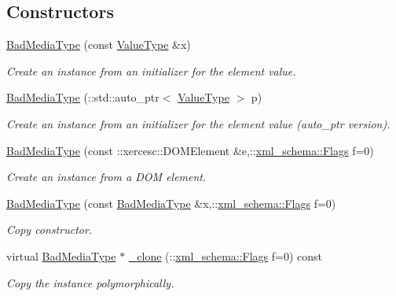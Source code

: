 \subsection*{Constructors}
\begin{DoxyCompactItemize}
\item 
\hyperlink{classopenstack_1_1xml_1_1BadMediaType_a827e80d7b575988d391fa8d8491f4aff}{BadMediaType} (const \hyperlink{classopenstack_1_1xml_1_1BadMediaTypeAPIFault}{ValueType} \&x)
\begin{DoxyCompactList}\small\item\em Create an instance from an initializer for the element value. \item\end{DoxyCompactList}\item 
\hyperlink{classopenstack_1_1xml_1_1BadMediaType_a79079b136a0ed4b1c25216ec65c24fe0}{BadMediaType} (::std::auto\_\-ptr$<$ \hyperlink{classopenstack_1_1xml_1_1BadMediaTypeAPIFault}{ValueType} $>$ p)
\begin{DoxyCompactList}\small\item\em Create an instance from an initializer for the element value (auto\_\-ptr version). \item\end{DoxyCompactList}\item 
\hyperlink{classopenstack_1_1xml_1_1BadMediaType_ab69de69eac22da49905e13bb951e3d48}{BadMediaType} (const ::xercesc::DOMElement \&e,::\hyperlink{namespacexml__schema_affb4c227cbd9aa7453dd1dc5a1401943}{xml\_\-schema::Flags} f=0)
\begin{DoxyCompactList}\small\item\em Create an instance from a DOM element. \item\end{DoxyCompactList}\item 
\hyperlink{classopenstack_1_1xml_1_1BadMediaType_a23f4bbd0e7b8fbdb262d3064dfed337d}{BadMediaType} (const \hyperlink{classopenstack_1_1xml_1_1BadMediaType}{BadMediaType} \&x,::\hyperlink{namespacexml__schema_affb4c227cbd9aa7453dd1dc5a1401943}{xml\_\-schema::Flags} f=0)
\begin{DoxyCompactList}\small\item\em Copy constructor. \item\end{DoxyCompactList}\item 
virtual \hyperlink{classopenstack_1_1xml_1_1BadMediaType}{BadMediaType} $\ast$ \hyperlink{classopenstack_1_1xml_1_1BadMediaType_a11ddeedfb766656f59f18436fc880da8}{\_\-clone} (::\hyperlink{namespacexml__schema_affb4c227cbd9aa7453dd1dc5a1401943}{xml\_\-schema::Flags} f=0) const 
\begin{DoxyCompactList}\small\item\em Copy the instance polymorphically. \item\end{DoxyCompactList}\end{DoxyCompactItemize}
